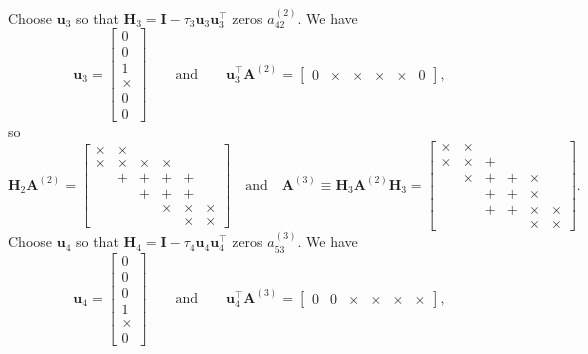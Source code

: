 \documentclass[12pt,a4paper]{article}
\begin{document}
Choose $\boldsymbol{u}_3$ so that
$\boldsymbol{H}_3=\boldsymbol{I}-\tau_3\boldsymbol{u}_3\boldsymbol{u}_3^\top$
zeros $a^{(2)}_{42}$. We have
\[
\boldsymbol{u}_3=\begin{bmatrix}0\\ 0\\ 1\\ \times\\ 0\\ 0\end{bmatrix}
\qquad\text{and}\qquad
\boldsymbol{u}_3^\top\boldsymbol{A}^{(2)}
=\begin{bmatrix}0&\times&\times&\times&\times&0\end{bmatrix},
\]
so
\[
\boldsymbol{H}_2\boldsymbol{A}^{(2)}
      =\begin{bmatrix}
\times&\times&      &      &      &      \\
\times&\times&\times&\times&      &      \\
      &     +&     +&     +&     +&      \\
      &      &     +&     +&     +&      \\
      &      &      &\times&\times&\times\\
      &      &      &      &\times&\times\end{bmatrix}
\quad\text{and}\quad
\boldsymbol{A}^{(3)}\equiv\boldsymbol{H}_3\boldsymbol{A}^{(2)}\boldsymbol{H}_3
      =\begin{bmatrix}
\times&\times&      &      &      &      \\
\times&\times&     +&      &      &      \\
      &\times&     +&     +&\times&      \\
      &      &     +&     +&\times&      \\
      &      &     +&     +&\times&\times\\
      &      &      &      &\times&\times\end{bmatrix}.
\]
Choose $\boldsymbol{u}_4$ so that
$\boldsymbol{H}_4=\boldsymbol{I}-\tau_4\boldsymbol{u}_4\boldsymbol{u}_4^\top$
zeros $a^{(3)}_{53}$. We have
\[
\boldsymbol{u}_4=\begin{bmatrix}0\\ 0\\ 0\\ 1\\ \times\\ 0\end{bmatrix}
\qquad\text{and}\qquad
\boldsymbol{u}_4^\top\boldsymbol{A}^{(3)}
=\begin{bmatrix}0&0&\times&\times&\times&\times\end{bmatrix},
\]
\end{document}
